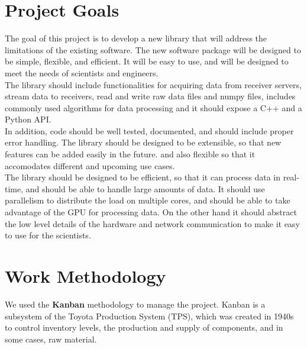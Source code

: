 \begin{spacing}{1.2}


    \section{Project Goals}
    The goal of this project is to develop a new library that will address the limitations of the existing software.
    The new software package will be designed to be simple, flexible, and efficient. It will be easy to use, and will be
    designed to meet the needs of scientists and engineers. \\

    The library should include functionalities for acquiring data from receiver servers, stream data to receivers,
    read and write raw data files and numpy files, includes commonly used algorithms for data processing and it should
    expose a C++ and a Python API. \\

    In addition, code should be well tested, documented, and should include proper error handling.
    The library should be designed to be extensible, so that new features can be added easily in the future.
    and also flexible so that it accomodates different and upcoming use cases. \\

    The library should be designed to be efficient, so that it can process data in real-time, and should be able to handle
    large amounts of data. It should use parallelism to distribute the load on multiple cores, and should be able to
    take advantage of the GPU for processing data. On the other hand it should abstract the low level details of the
    hardware and network communication to make it easy to use for the scientists.




    \section{Work Methodology}
    We used the \textbf{Kanban} methodology to manage the project. Kanban is a subsystem of the Toyota Production System (TPS),
    which was created in 1940s to control inventory levels, the production and
    supply of components, and in some cases, raw material. \cite{junior2010variations}


\end{spacing}
